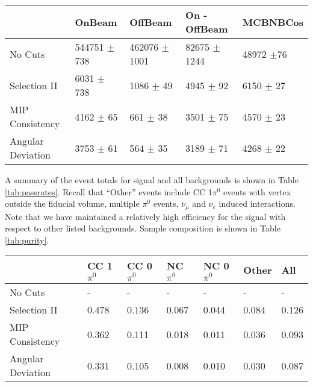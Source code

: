 \begin{table*} 
 \centering
 \begin{tabular}{| l | l | l | l | l |}
  \hline
   & OnBeam & OffBeam & On - OffBeam & MCBNBCos \\ [0.1ex] \hline
No Cuts & 544751 $\pm$ 738 & 462076 $\pm$ 1001 & 82675 $\pm$ 1244 & 48972 $\pm$76 \\ 
Selection II & 6031 $\pm$ 738 & 1086 $\pm$ 49 & 4945 $\pm$ 92 & 6150 $\pm$ 27  \\ \hline
MIP Consistency & 4162 $\pm$ 65 & 661 $\pm$ 38 & 3501 $\pm$ 75 & 4570 $\pm$ 23  \\ 
Angular Deviation & 3753 $\pm$ 61 & 564 $\pm$ 35 & 3189 $\pm$ 71 & 4268 $\pm$ 22  \\ \hline

\end{tabular}
 \end{table*}

\par A summary of the event totals for signal and all backgrounds is shown in Table \ref{tab:passrates}.  Recall that ``Other'' events include CC 1$\pi^0$ events with vertex outside the fiducial volume, multiple $\pi^0$ events, $\overline{\nu}_\mu$ and $\nu_e$ induced interactions.  Note that we have maintained a relatively high efficiency for the signal with respect to other listed backgrounds. Sample composition is shown in Table \ref{tab:purity}. 

\begin{table*}
\centering
{}
 \begin{tabular}{| l | l | l |l|l|l|l|}
 \hline
 & CC 1$\pi^0$ & CC 0$\pi^0$ & NC $\pi^0$ & NC 0$\pi^0$ & Other & All \\ [0.1ex] \hline
No Cuts & - & - & - & - & - & -\\
Selection II & 0.478 & 0.136 & 0.067 & 0.044 & 0.084 & 0.126 \\ \hline
MIP Consistency & 0.362 & 0.111 & 0.018 & 0.011 & 0.036 & 0.093 \\ 
Angular Deviation & 0.331 & 0.105 & 0.008 & 0.010 & 0.030 & 0.087 \\ \hline
\end{tabular}
\end{table*}


